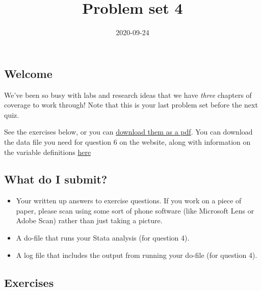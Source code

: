 \documentclass[
]{article}
\title{Problem set 4}
\author{}
\date{2020-09-24}
\providecommand{\tightlist}{%
  \setlength{\itemsep}{0pt}\setlength{\parskip}{0pt}}
\begin{document}
\maketitle

\hypertarget{welcome}{%
\subsection{Welcome}\label{welcome}}

We've been so busy with labs and research ideas that we have
\emph{three} chapters of coverage to work through! Note that this is
your last problem set before the next quiz.

See the exercises below, or you can \href{../04-ps.pdf}{download them as
a pdf}. You can download the data file you need for question 6
on the website, along with information on the
variable definitions
\href{https://www.princeton.edu/~mwatson/Stock-Watson_3u/Students/EE_Datasets/Growth_Description.pdf}{here}

\hypertarget{what-do-i-submit}{%
\subsection{What do I submit?}\label{what-do-i-submit}}

\begin{itemize}
\tightlist
\item
  Your written up answers to exercise questions. If you work on a piece
  of paper, please scan using some sort of phone software (like
  Microsoft Lens or Adobe Scan) rather than just taking a picture.
\item
  A do-file that runs your Stata analysis (for question 4).
\item
  A log file that includes the output from running your do-file (for
  question 4).
\end{itemize}

\hypertarget{exercises}{%
\subsection{Exercises}\label{exercises}}
\end{document}
